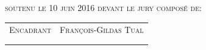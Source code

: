 \begin{titlepage}
\begin{bigcenter}

\vspace{2.5cm}


\textsc{soutenu le 10 juin 2016 devant le jury composé de:}\\[0.35cm]

\begin{tabular}{ll}
  \textsc{Encadrant} & \textsc{François-Gildas Tual}\\
  \textsc{} & \textsc{}\\
  \textsc{} & \textsc{}\\
\end{tabular}


\end{bigcenter}
\end{titlepage}

\ClearShipoutPicture

